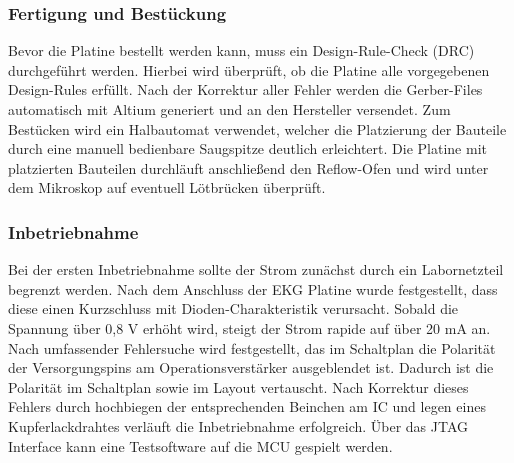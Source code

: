 

\subsubsection{Fertigung und Bestückung}
Bevor die Platine bestellt werden kann, muss ein Design-Rule-Check (DRC) durchgeführt werden. Hierbei wird überprüft, ob die Platine alle vorgegebenen Design-Rules erfüllt. Nach der Korrektur aller Fehler werden die Gerber-Files automatisch mit Altium generiert und an den Hersteller versendet.
Zum Bestücken wird ein Halbautomat verwendet, welcher die Platzierung der Bauteile durch eine manuell bedienbare Saugspitze deutlich erleichtert. Die Platine mit platzierten Bauteilen durchläuft anschließend den Reflow-Ofen und wird unter dem Mikroskop auf eventuell Lötbrücken überprüft.

\subsubsection{Inbetriebnahme}
Bei der ersten Inbetriebnahme sollte der Strom zunächst durch ein Labornetzteil begrenzt werden. Nach dem Anschluss der EKG Platine wurde festgestellt, dass diese einen Kurzschluss mit Dioden-Charakteristik verursacht. Sobald die Spannung über 0,8 V erhöht wird, steigt der Strom rapide auf über 20 mA an. Nach umfassender Fehlersuche wird festgestellt, das im Schaltplan die Polarität der Versorgungspins am Operationsverstärker ausgeblendet ist. Dadurch ist die Polarität im Schaltplan sowie im Layout vertauscht. Nach Korrektur dieses Fehlers durch hochbiegen der entsprechenden Beinchen am IC und legen eines Kupferlackdrahtes verläuft die Inbetriebnahme erfolgreich. Über das JTAG Interface kann eine Testsoftware auf die MCU gespielt werden.